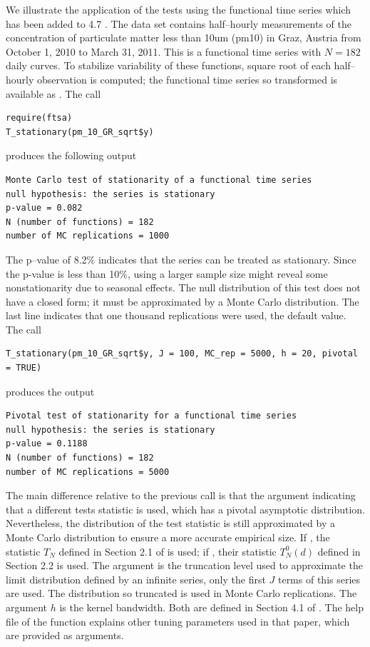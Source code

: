 \documentclass[nojss]{jss}
\begin{document}
We illustrate the application of the tests using the functional time series  which has been added to  4.7 \citep{ftsa}. The data set  contains half--hourly measurements of the concentration of particulate matter less than 10um (pm10) in Graz, Austria from October 1, 2010 to March 31, 2011. This is a functional time series with $N=182$ daily curves. To stabilize variability of these functions, square root of each half--hourly observation is computed; the functional time series so transformed is  available as . The call 
\begin{Verbatim}
require(ftsa)
T_stationary(pm_10_GR_sqrt$y)
\end{Verbatim} 
produces the following output
\begin{small}
\begin{Verbatim} 
Monte Carlo test of stationarity of a functional time series
null hypothesis: the series is stationary
p-value = 0.082
N (number of functions) = 182
number of MC replications = 1000
\end{Verbatim}
\end{small}
The p--value of 8.2\% indicates that the series can be treated as stationary. Since the p-value is less than 10\%, using a larger sample size might reveal some nonstationarity due to seasonal effects. The null distribution of this test does not have a closed form; it must be approximated by a Monte Carlo distribution. The last line indicates that one thousand replications were used, the default value. The call 
\begin{Verbatim} 
T_stationary(pm_10_GR_sqrt$y, J = 100, MC_rep = 5000, h = 20, pivotal = TRUE)
\end{Verbatim} 
produces the output 
\begin{small}
\begin{Verbatim} 
Pivotal test of stationarity for a functional time series
null hypothesis: the series is stationary
p-value = 0.1188
N (number of functions) = 182
number of MC replications = 5000
\end{Verbatim}
\end{small}
The main difference relative to the previous call is that the argument  indicating that a different tests statistic is used,  which has a pivotal asymptotic distribution. Nevertheless, the distribution of the test statistic is still approximated by a Monte Carlo distribution to ensure a more accurate empirical size. If , the statistic $T_N$ defined in Section 2.1 of \cite{HKR14} is used; if , their statistic $T_N^0(d)$ defined in Section 2.2 is used. The argument  is the truncation level used to approximate the limit distribution defined by an infinite series, only the first $J$ terms of this series are used. The distribution so truncated is used in Monte Carlo replications. The argument $h$ is the kernel bandwidth. Both are defined in Section 4.1 of \cite{HKR14}. The help file of the function  explains other tuning parameters  used in that paper, which are provided  as arguments.  
\end{document}
